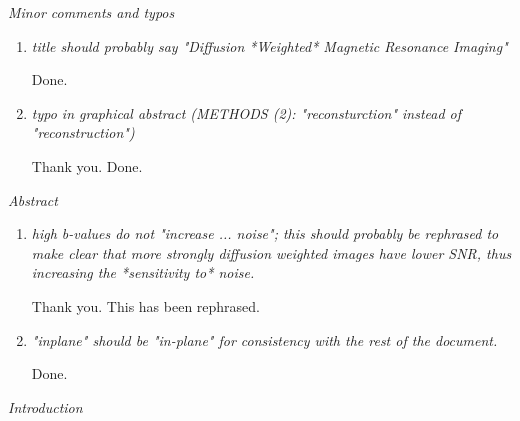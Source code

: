 \documentclass[a4paper,11pt,twoside]{report}
\begin{document}
\noindent \textit{Minor comments and typos}

\begin{enumerate}[resume]
    \item \textit{title should probably say "Diffusion *Weighted* Magnetic Resonance Imaging"}

    \hspace{1em} Done.

    \item \textit{typo in graphical abstract (METHODS (2): "reconsturction" instead of "reconstruction")}

    \hspace{1em} Thank you. Done.

\end{enumerate}


\noindent \textit{Abstract}

\begin{enumerate}[resume]
    \item \textit{high b-values do not "increase ... noise"; this should probably be rephrased to make clear that more strongly diffusion weighted images have lower SNR, thus increasing the *sensitivity to* noise.}

    \hspace{1em} Thank you. This has been rephrased.

    \item \textit{"inplane" should be "in-plane" for consistency with the rest of the document.}

    \hspace{1em} Done.

\end{enumerate}


\noindent \textit{Introduction}
\end{document}
